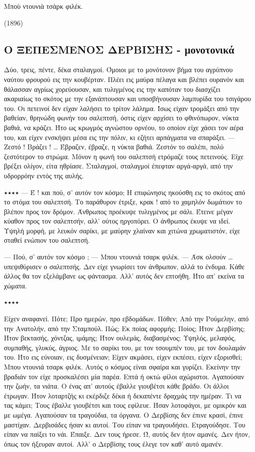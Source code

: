 \documentclass{article}
\begin{document}
Μποὺ ντουνιὰ τσὰρκ φιλέκ.

(1896)

\subsection{Ο ΞΕΠΕΣΜΕΝΟΣ ΔΕΡΒΙΣΗΣ - μονοτονικά}
\label{sec-1-2}

Δύο, τρεις, πέντε, δέκα σταλαγμοί.
Όμοιοι με το μονότονον βήμα του αγρύπνου ναύτου φρουρού εις την κουβέρταν. Πλέει εις μαύρα πέλαγα και βλέπει ουρανόν και θάλασσαν αγρίως χορεύουσαν, και τυλιγμένος εις την καπόταν του διασχίζει ακαριαίως το σκότος με την εξανάπτουσαν και υποσβήνουσαν λαμπυρίδα του τσιγάρου του.
Οι πετεινοί δεν είχαν λαλήσει το τρίτον λάλημα. Ίσως είχαν τρομάξει από την βαθείαν, θρηνώδη φωνήν του σαλεπτσή, όστις είχεν αρχίσει το φθινόπωρον, νύκτα βαθιά, να κράζει. Ήτο ως κρωγμός αγνώστου ορνέου, το οποίον είχε χάσει τον αέρα του, και είχεν ενσκήψει μέσα εις την πόλιν, κι εζήτει αρπάγματα να σπαράξει.
— Ζεστό ! Βράζει ! …
Έβραζεν, έβραζε, η νύκτα βαθιά. Ζεστόν το σαλέπι, πολύ ζεστότερον το στρώμα. Μόνον η φωνή του σαλεπτσή ετρόμαζε τους πετεινούς.
Είχε βρέξει ολίγον, είτα ηθρίασε. Σταλαγμοί, σταλαγμοί έπεφταν αργά-αργά, από την υδρορρόην εντός της αυλής.

٭٭٭٭
—    Έ ! και πού, σ’ αυτόν τον κόσμο;
Η επιφώνησις ηκούσθη εις το σκότος από το στόμα του σαλεπτσή.
Το παράθυρον έτριξε, κρακ ! από το χαμηλόν δωμάτιον το βλέπον προς τον δρόμον. Άνθρωπος προέκυψε τυλιγμένος με σάλι. Έτεινε μέγαν κύαθον προς τον σαλεπτσήν, αλλ’ ούτος ηργοπόρει.
Ο άνθρωπος έκυψε να ιδεί.
Υψηλή μορφή, με λευκόν σαρίκι, με μαύρην χλαίναν και χιτώνα χρωματιστόν, είχε σταθεί ενώπιον του σαλεπτσή.




—    Πού, σ’ αυτόν τον κόσμο ;
—    Μπου ντουνιά τσαρκ φιλέκ.
—    Άσκ ολσούν … υπεψιθύρισεν ο σαλεπτσής.
Δεν είχε γνωρίσει τον άνθρωπον, αλλά το ένδυμα. Κάθε άλλος θα τον εξελάμβανε ως φάντασμα. Αλλ’ αυτός δεν επτοήθη. Ήτο απ’ εκείνα τα χώματα.

٭٭٭٭

Είχεν αναφανεί. Πότε; Προ ημερών, προ εβδομάδων. Πόθεν; Από την Ρούμελην, από την Ανατολήν, από την Σταμπούλ. Πώς; Εκ ποίας αφορμής; Ποίος;
Ήτον Δερβίσης; Ήτον βεκτασής, χόντζας, ιμάμης; Ήτον ουλεμάς, διαβασμένος; Υψηλός, μελαψός, συμπαθής, γλυκύς, άγριος. Με το σαρίκι του, με τον τσουμπέν του, με τον δουλαμάν του.
Ήτο εις εύνοιαν, εις δυσμένειαν; Είχεν ακμάσει, είχεν εκπέσει, είχεν εξορισθεί; Μπου ντουνιά τσαρκ φιλέκ. Αυτός ο κόσμος είναι σφαίρα και γυρίζει.
Εκείνην την βραδιάν τον είχε προσκαλέσει μία παρέα. Επτά ή οκτώ φίλοι αχώριστοι. Αγαπούσαν την ζωήν, τα νιάτα. Ο ένας απ’ αυτούς έβαλλε γιουβέτσι κάθε βράδυ. Οι άλλοι έτρωγαν.
Ήτον λοταρτζής κι εκέρδιζε δέκα ή δεκαπέντε δραχμάς την ημέραν. Τι να τας κάμει; Τους έβαλλε γιουβέτσι και τους εφίλευε. Ήσαν λοτοφάγοι, με ομικρόν και με ωμέγα.
Αγαπούσαν τα τραγούδια, τα όργανα. Ο Δερβίσης δεν έπινε κρασί, έπινε μαστίχαν. Δερβισάδες ήσαν κι αυτοί. Του είπαν να τραγουδήσει. Ετραγούδησε. Του είπαν να παίξει το νάι. Έπαιξε.
Δεν τους ήρεσε. Ώ, αυτός δεν ήτον αμανές.
Δεν ήτον, όπως τον ήξευραν αυτοί. Αλλ’ ο Δερβίσης τους έλεγε τον καθ’ αυτό αμανέν.
\end{document}
